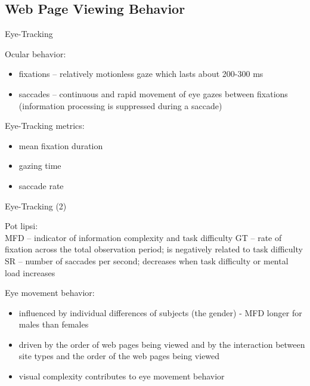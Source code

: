 \subsection{Web Page Viewing Behavior}


\begin{frame}{Eye-Tracking}

Ocular behavior:
\begin{itemize}
	\item fixations – relatively motionless gaze which lasts about 200-300 ms
	\item saccades – continuous and rapid movement of eye gazes between fixations (information processing is suppressed during a saccade) \newline
\end{itemize}

Eye-Tracking metrics:
\begin{itemize}
	\item mean fixation duration
	\item gazing time
	\item saccade rate \newline
\end{itemize}

\end{frame}


\begin{frame}{Eye-Tracking (2)}

{\color{red} Pot lipsi:\\
MFD – indicator of information complexity and task difficulty \newline
GT – rate of fixation across the total observation period; is negatively related to task difficulty \newline
SR – number of saccades per second; decreases when task difficulty or mental load increases \newline
}

Eye movement behavior:
\begin{itemize}
	\item influenced by individual differences of subjects (the gender) \newline
		- MFD longer for males than females
	\item driven by the order of web pages being viewed and by the interaction between site types and the order of the web pages being viewed
	\item visual complexity contributes to eye movement behavior
\end{itemize}

\end{frame}



